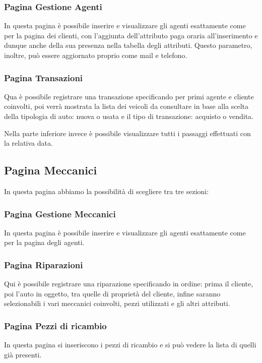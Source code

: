 \documentclass[a4paper,12pt]{report}
\begin{document}
\subsubsection*{Pagina Gestione Agenti}
In questa pagina è possibile inserire e visualizzare gli agenti esattamente come per la pagina dei clienti, con 
%
l'aggiunta dell'attributo paga oraria all'inserimento e dunque anche della sua presenza nella tabella degli attributi.
%
Questo parametro, inoltre, può essere aggiornato proprio come mail e telefono.

\subsubsection*{Pagina Transazioni}
Qua è possibile registrare una transazione specificando per primi agente e cliente coinvolti, poi verrà mostrata la lista
%
dei veicoli da consultare in base alla scelta della tipologia di auto: nuova o usata e il tipo di transazione: acquisto o vendita.

Nella parte inferiore invece è possibile visualizzare tutti i passaggi effettuati con la relativa data.

\subsection*{Pagina Meccanici}
In questa pagina abbiamo la possibilità di scegliere tra tre sezioni:

\subsubsection*{Pagina Gestione Meccanici}
In questa pagina è possibile inserire e visualizzare gli agenti esattamente come per la pagina degli agenti.

\subsubsection*{Pagina Riparazioni}
Qui è possibile registrare una riparazione specificando in ordine: prima il cliente, poi l'auto in oggetto, tra quelle 
%
di proprietà del cliente, infine saranno selezionabili i vari meccanici coinvolti, pezzi utilizzati e gli altri attributi.

\subsubsection*{Pagina Pezzi di ricambio}
In questa pagina si inseriscono i pezzi di ricambio e si può vedere la lista di quelli già presenti.
\end{document}
